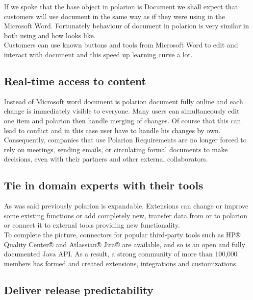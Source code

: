 \documentclass[thesis=M,english]{FITthesis}[2012/06/26]
\begin{document}
If we spoke that the base object in \acrshort{polarion} is Document we shall expect that customers will use document in the same way as if they were using in the Microsoft Word. Fortunately behaviour of document in \acrshort{polarion} is very similar in both using and how looks like.\\

Customers can use known buttons and tools from Microsoft Word to edit and interact with document and this speed up learning curve a lot. 

\subsection{Real-time access to content}

Instead of Microsoft word document is \acrshort{polarion} document fully online and each change is immediately visible to everyone. Many users can simultaneously edit one item and \acrshort{polarion} then handle merging of changes. Of course that this can lead to conflict and in this case user have to handle his changes by own.\\ 

Consequently, companies that use Polarion Requirements are no longer forced to rely on meetings, sending emails, or circulating formal documents to make decisions, even with their partners and other external collaborators.

\subsection{Tie in domain experts with their tools}

As was said previously \acrshort{polarion} is expandable. Extensions can change or improve some existing functions or add completely new, transfer data from or to \acrshort{polarion} or connect it to external tools providing new functionality.\\

To complete the picture, connectors for popular third-party tools such as HP® Quality Center® and Atlassian® Jira® are available, and so is an open and fully documented Java API. As a result, a strong community of more than 100,000 members has formed and created extensions, integrations and customizations.

\subsection{Deliver release predictability}
\end{document}
